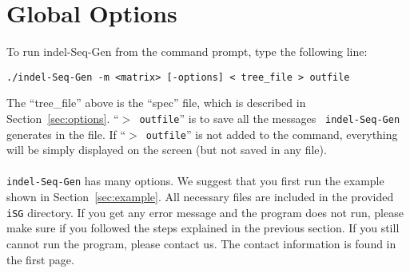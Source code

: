 \documentclass[10pt]{article}
\begin{document}
\section{Global Options}

To run indel-Seq-Gen from the command prompt, type the following line:

\begin{verbatim}
./indel-Seq-Gen -m <matrix> [-options] < tree_file > outfile
\end{verbatim}

\noindent The ``tree\_file'' above is the ``spec'' file, which is described in
Section~\ref{sec:options}. ``{\tt $>$ outfile}'' is to save all the messages {\tt
indel-Seq-Gen} generates in the file. If ``{\tt $>$ outfile}'' is not added to the command, everything will be simply displayed on the screen (but not saved in any file).\\~\\

{\tt indel-Seq-Gen} has many options. We suggest that you first run the example shown in
Section~\ref{sec:example}.  All necessary files are included in the provided {\tt iSG}
directory.  If you get any error message and the program does not run, please make sure if you followed the steps explained in the previous section. If you still cannot run the program, please contact us. The contact information is found in the first page.
\end{document}
